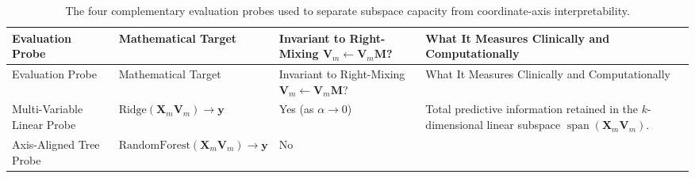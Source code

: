 \documentclass[
  10pt,
  letterpaper,
]{report}
\begin{document}
\begin{longtable}[]{@{}
  >{\raggedright\arraybackslash}p{}
  >{\raggedright\arraybackslash}p{}
  >{\raggedright\arraybackslash}p{}
  >{\raggedright\arraybackslash}p{}@{}}
\caption{The four complementary evaluation probes used to separate
subspace capacity from coordinate-axis
interpretability.}\label{tbl-evaluation-probes}\tabularnewline
\toprule\noalign{}
\begin{minipage}[b]{\linewidth}\raggedright
Evaluation Probe
\end{minipage} & \begin{minipage}[b]{\linewidth}\raggedright
Mathematical Target
\end{minipage} & \begin{minipage}[b]{\linewidth}\raggedright
Invariant to Right-Mixing
\(\mathbf{V}_m \leftarrow \mathbf{V}_m \mathbf{M}\)?
\end{minipage} & \begin{minipage}[b]{\linewidth}\raggedright
What It Measures Clinically and Computationally
\end{minipage} \\
\midrule\noalign{}
\endfirsthead
\toprule\noalign{}
\begin{minipage}[b]{\linewidth}\raggedright
Evaluation Probe
\end{minipage} & \begin{minipage}[b]{\linewidth}\raggedright
Mathematical Target
\end{minipage} & \begin{minipage}[b]{\linewidth}\raggedright
Invariant to Right-Mixing
\(\mathbf{V}_m \leftarrow \mathbf{V}_m \mathbf{M}\)?
\end{minipage} & \begin{minipage}[b]{\linewidth}\raggedright
What It Measures Clinically and Computationally
\end{minipage} \\
\midrule\noalign{}
\endhead
\bottomrule\noalign{}
\endlastfoot
Multi-Variable Linear Probe &
\(\text{Ridge}(\mathbf{X}_m \mathbf{V}_m) \to \mathbf{y}\) & Yes (as
\(\alpha \to 0\)) & Total predictive information retained in the
\(k\)-dimensional linear subspace
\(\operatorname{span}(\mathbf{X}_m \mathbf{V}_m)\). \\
Axis-Aligned Tree Probe &
\(\text{RandomForest}(\mathbf{X}_m \mathbf{V}_m) \to \mathbf{y}\) & No &

\end{longtable}
\end{document}

